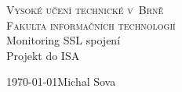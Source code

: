 \begin{titlepage}
\begin{center}
\textsc{\Huge
Vysoké učení technické v~Brně\\[0.3em]
\huge Fakulta informačních technologií}\\
{\LARGE Monitoring SSL spojení\\[0.3em]
\Huge Projekt do ISA}\\
\end{center}
{\Large \today \hfill Michal Sova}
\end{titlepage}
